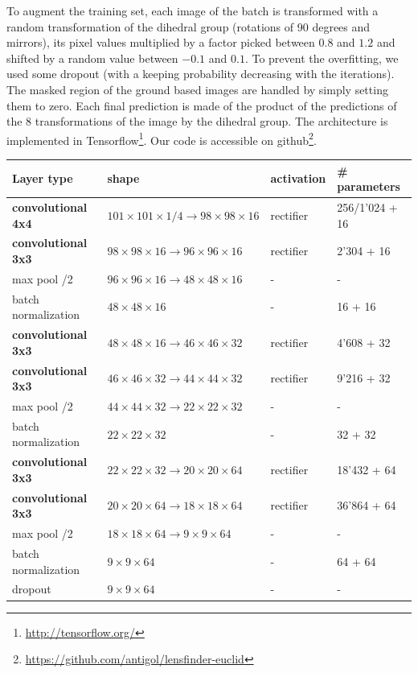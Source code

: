 \documentclass[useAMS,usenatbib]{mnras}
\begin{document}
To augment the training set, each image of the batch is transformed with a random transformation of the dihedral group (rotations of 90 degrees and mirrors), its pixel values multiplied by a factor picked between $0.8$ and $1.2$ and shifted by a random value between $-0.1$ and $0.1$.
To prevent the overfitting, we used some dropout \citep{dropout} (with a keeping probability decreasing with the iterations).
The masked region of the ground based images are handled by simply setting them to zero.
Each final prediction is made of the product of the predictions of the 8 transformations of the image by the dihedral group.
The architecture is implemented in Tensorflow\footnote{\url{http://tensorflow.org/}}.
Our code is accessible on github\footnote{\url{https://github.com/antigol/lensfinder-euclid}}.

\begin{table}
    \centering
    \begin{tabular}{|l|l|l|l|}
        \hline
        Layer type & shape & activation & \# parameters \\ \hline \hline
        
        \textbf{convolutional 4x4} & $101\!\times\! 101\!\times\!1/4 \to 98\!\times\!98\!\times\!16$ & rectifier & 256/1'024 + 16 \\ \hline
        \textbf{convolutional 3x3} & $98\times98\times16 \to 96\times96\times16$ & rectifier & 2'304 + 16 \\ \hline
        max pool /2 & $96\times96\times16 \to 48\times48\times16$ & - & - \\ \hline
        batch normalization & $48\times48\times16$ & - & 16 + 16 \\ \hline
        
        \textbf{convolutional 3x3} & $48\times48\times16 \to 46\times46\times32$ & rectifier & 4'608 + 32 \\ \hline
        \textbf{convolutional 3x3} & $46\times46\times32 \to 44\times44\times32$ & rectifier & 9'216 + 32 \\ \hline
        max pool /2 & $44\times44\times32 \to 22\times22\times32$ & - & - \\ \hline
        batch normalization & $22\times22\times32$ & - & 32 + 32 \\ \hline
        
        \textbf{convolutional 3x3} & $22\times22\times32 \to 20\times20\times64$ & rectifier & 18'432 + 64 \\ \hline
        \textbf{convolutional 3x3} & $20\times20\times64 \to 18\times18\times64$ & rectifier & 36'864 + 64 \\ \hline
        max pool /2 & $18\times18\times64 \to 9\times9\times64$ & - & - \\ \hline
        batch normalization & $9\times9\times64$ & - & 64 + 64 \\ \hline
        dropout & $9\times9\times64$ & - & - \\ \hline
        

\end{tabular}
\end{table}
\end{document}
